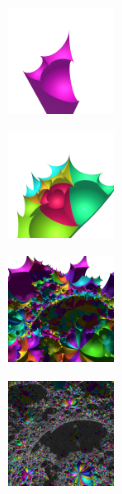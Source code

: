 \documentclass[dvipdfmx]{interact}
\theoremstyle{plain}%
\theoremstyle{definition}
\theoremstyle{remark}
\theoremstyle{problemstyle}
\begin{document}
\begin{figure}[h!tbp]
 \begin{minipage}[t]{0.18\textwidth}
  \centering
  \includegraphics[height=1.1in, keepaspectratio]{./img/constructFractal/terrainProcess/step1.png}
  \label{fig:terrainStep1}
 \end{minipage}
 \hspace*{\fill}
 \begin{minipage}[t]{0.18\textwidth}
  \centering
  \includegraphics[height=1.1in, keepaspectratio]{./img/constructFractal/terrainProcess/step2.png}
  \label{}
 \end{minipage}
 \hspace*{\fill}
 \begin{minipage}[t]{0.18\textwidth}
  \centering
  \includegraphics[height=1.1in, keepaspectratio]{./img/constructFractal/terrainProcess/step5.png}
  \label{}
 \end{minipage}
 \hspace*{\fill}
 \begin{minipage}[t]{0.18\textwidth}
  \centering
  \includegraphics[height=1.1in, keepaspectratio]{./img/constructFractal/terrainProcess/step10.jpg}
  \label{fig:terrainStep10}
 \end{minipage}

\end{figure}
\end{document}
